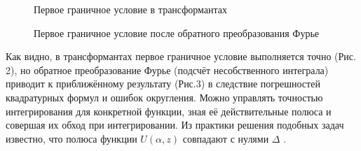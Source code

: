 \documentclass[a4paper, 12pt]{article}
\begin{document}
\begin{figure}[h!]
\noindent{}
\caption{Первое граничное условие в трансформантах}
\label{figCurves}
\end{figure}

\begin{figure}[h!]
\noindent{}
\caption{Первое граничное условие после обратного преобразования Фурье}
\label{figCurves}
\end{figure}

Как видно, в трансформантах первое граничное условие выполняется точно (Рис. 2), но обратное преобразование Фурье (подсчёт несобственного интеграла) приводит к приближённому результату (Рис.3) в следствие погрешностей квадратурных формул и ошибок округления. Можно управлять точностью интегрирования для конкретной функции, зная её действительные полюса и совершая их обход при интегрировании. Из практики решения подобных задач известно, что полюса функции $U(\alpha,z)$ совпадают с нулями $\Delta$ \cite{g89,new}.
\end{document}
